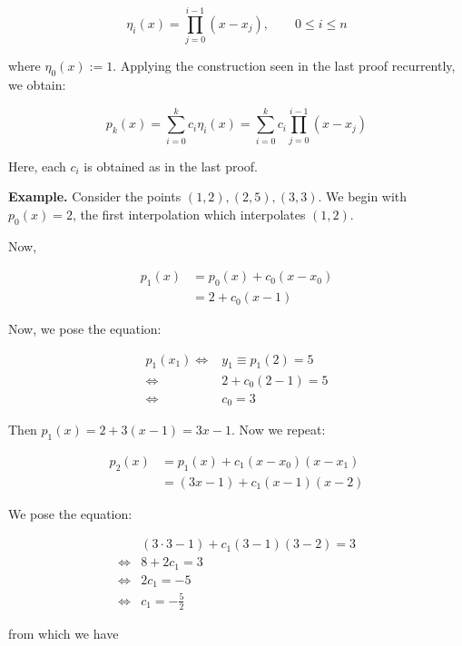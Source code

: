 \documentclass[12pt]{article}
\theoremstyle{definition}
\begin{document}
\begin{equation*}
    \eta_i(x) = \prod_{j=0}^{i-1}(x - x_j), \qquad 0 \leq i \leq n
\end{equation*}

where $\eta_0(x) := 1$. Applying the construction seen in the last proof
recurrently, we obtain: 

\begin{equation*}
    p_k(x) = \sum_{i=0}^k c_i \eta_i(x) = \sum_{i=0}^k c_i \prod_{j=0}^{i-1}(x - x_j) 
\end{equation*}

Here, each $c_i$ is obtained as in the last proof.

\begin{shaded}
    \textbf{Example.} Consider the points $(1, 2), (2, 5), (3, 3)$. We begin
    with $p_0(x) = 2$, the first interpolation which interpolates $(1, 2)$.

    Now, 

    \begin{align*}
        p_1(x) 
        &= p_0(x) + c_0(x - x_0)\\ 
        &=2 + c_0(x - 1)
    \end{align*}

    Now, we pose the equation: 

    \begin{align*}
        p_1(x_1) 
        \iff& y_1  \equiv p_1(2) = 5 \\ 
        \iff&2 + c_0(2 - 1) = 5 \\ 
        \iff&c_0 = 3
    \end{align*}

    Then $p_1(x) = 2 + 3(x-1) = 3x - 1$. Now we repeat: 

    \begin{align*}
        p_2(x) 
        &= p_1(x) + c_1(x - x_0)(x-x_1)\\ 
        &= (3x - 1) + c_1(x - 1)(x - 2)
    \end{align*}

    We pose the equation: 

    \begin{align*}
        &(3 \cdot 3 - 1) + c_1(3 - 1)(3 - 2) = 3 \\ 
        \iff& 8 + 2c_1 = 3 \\ 
        \iff&2c_1 = -5 \\ 
        \iff&c_1 = -\frac{5}{2}
    \end{align*}

    from which we have 


\end{shaded}
\end{document}
